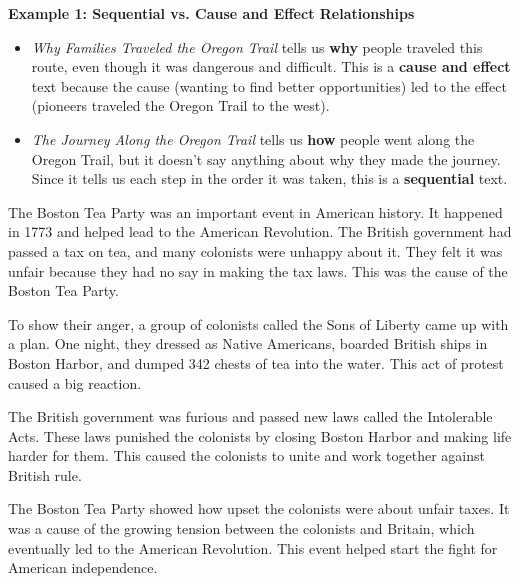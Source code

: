 \documentclass[12pt]{article}
\begin{document}
\begin{tcolorbox}[colframe=black!60, colback=white, 
coltitle=black, colbacktitle=black!15, fonttitle=\bfseries\Large, 
title=Examples, halign title=center, left=10pt, right=10pt, top=10pt, bottom=15pt]

\textbf{Example 1: Sequential vs. Cause and Effect Relationships}

\begin{itemize}
    \item \textit{Why Families Traveled the Oregon Trail} tells us \textbf{why} people traveled this route, even though it was dangerous and difficult. This is a \textbf{cause and effect} text because the cause (wanting to find better opportunities) led to the effect (pioneers traveled the Oregon Trail to the west).
\end{itemize}
\begin{itemize}
    \item \textit{The Journey Along the Oregon Trail} tells us \textbf{how} people went along the Oregon Trail, but it doesn't say anything about why they made the journey. Since it tells us each step in the order it was taken, this is a \textbf{sequential} text.
\end{itemize}
        


\end{tcolorbox}

\vspace{1em}

\begin{tcolorbox}[colframe=black!60, colback=white, 
coltitle=black, colbacktitle=black!15, fonttitle=\bfseries\Large, 
title=Text 3: The Boston Tea Party, halign title=center, left=10pt, right=10pt, top=10pt, bottom=15pt]

The Boston Tea Party was an important event in American history. It happened in 1773 and helped lead to the American Revolution. The British government had passed a tax on tea, and many colonists were unhappy about it. They felt it was unfair because they had no say in making the tax laws. This was the cause of the Boston Tea Party.

To show their anger, a group of colonists called the Sons of Liberty came up with a plan. One night, they dressed as Native Americans, boarded British ships in Boston Harbor, and dumped 342 chests of tea into the water. This act of protest caused a big reaction.

The British government was furious and passed new laws called the Intolerable Acts. These laws punished the colonists by closing Boston Harbor and making life harder for them. This caused the colonists to unite and work together against British rule.

The Boston Tea Party showed how upset the colonists were about unfair taxes. It was a cause of the growing tension between the colonists and Britain, which eventually led to the American Revolution. This event helped start the fight for American independence.



 

     \end{tcolorbox}
\end{document}
